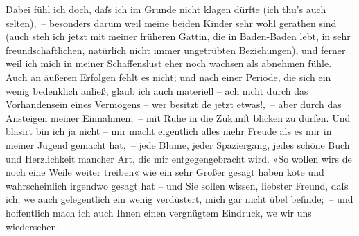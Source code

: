\pstart
           Dabei fühl ich doch, daſs ich im Grunde nicht klagen dürfte (ich thu’s auch
                    selten), – besonders darum weil meine beiden Kinder sehr wohl gerathen
                    sind (auch steh ich jetzt mit meiner früheren Gattin, die in Baden-Baden lebt, in sehr freundschaftlichen, natürlich nicht immer
                        unge{\pb}trübten Beziehungen), und ferner
                    weil ich mich in meiner Schaffenslust eher noch wachsen als abnehmen fühle. Auch
                    an äußeren Erfolgen fehlt es nicht; und nach einer Periode, die sich ein wenig
                    bedenklich anließ, glaub ich auch materiell – ach nicht durch das Vorhandensein
                    eines Vermögens – wer besitzt de{\geminationn} jetzt etwas!, –
                    aber durch das Ansteigen meiner Einnahmen, – mit Ruhe in die Zukunft blicken zu
                    dürfen. Und blasirt bin ich ja nicht – mir macht eigentlich alles mehr Freude
                    als es mir in meiner Jugend gemacht hat, – jede Blume, jeder Spaziergang, jedes
                    schöne Buch und Herzlichkeit mancher Art, die mir entgegengebracht wird. »So
                    wollen wirs de{\geminationn} noch eine Weile weiter treiben« wie
                    ein sehr Großer gesagt haben kö{\geminationn}te und
                    wahrscheinlich irgendwo gesagt hat – und Sie sollen wissen, liebster Freund,
                    daſs ich, we{\geminationn} auch gelegentlich ein wenig
                    verdüstert, {\pb}mich gar nicht übel befinde; –
                    und hoffentlich mach ich auch Ihnen einen vergnügtem Eindruck, we{\geminationn} wir uns wiedersehen.\pend
           

